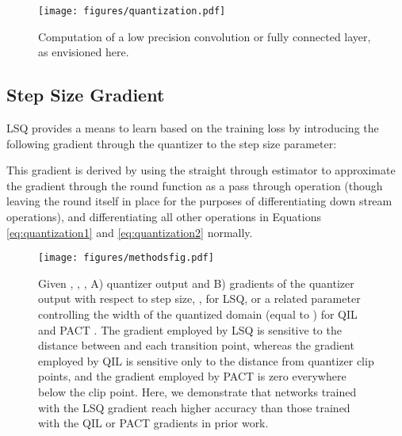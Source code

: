 \documentclass{article}
\begin{document}
\begin{figure}[ht]
\begin{center}
  	\centerline{\texttt{[image: figures/quantization.pdf]}}
  	\caption{
  	Computation of a low precision convolution or fully connected layer, as envisioned here.
  	}
  	\label{fig:quantization}
	\end{center}
\end{figure}


\subsection{Step Size Gradient}
\label{methods:LSQ}

LSQ provides a means to learn  based on the training loss by introducing the following gradient through the quantizer to the step size parameter:

This gradient is derived by using the straight through estimator \citep{bengio2013estimating} to approximate the gradient through the round function as a pass through operation (though leaving the round itself in place for the purposes of differentiating down stream operations), and differentiating all other operations in Equations \ref{eq:quantization1} and \ref{eq:quantization2} normally.


\begin{figure}[ht]
\begin{center}
  	\centerline{\texttt{[image: figures/methodsfig.pdf]}}
	\caption{Given , , , A) quantizer output and B)
gradients of the quantizer output with respect to step size, , for LSQ, or a related parameter controlling the width of the quantized domain (equal to ) for QIL \citep{jung2018joint} and PACT \citep{choi2018pact}.
The gradient employed by LSQ is sensitive to the distance between  and each transition point,
whereas the gradient employed by QIL \citep{jung2018joint} is sensitive only to the distance from quantizer clip points,
and the gradient employed by PACT \citep{choi2018pact} is zero everywhere below the clip point.
Here, we demonstrate that networks trained with the LSQ gradient reach higher accuracy than those trained with the QIL or PACT gradients in prior work.
	}
	\label{fig:gradients}
  	\end{center}
\end{figure}
\end{document}
